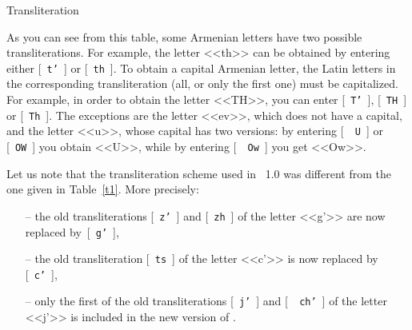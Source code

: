 \documentclass[12pt,a4paper,draft]{article}
\begin{document}
\begin{table}[ht]
\centerline{\vbox{\offinterlineskip
{}}}
\caption{Transliteration}
\label{t1}
\end{table}

As you can see from this table, some Armenian letters have two possible
transliterations. For example, the letter {\artm <<th>>} can be obtained by
entering either [~{\tt t'}~] or [~{\tt th}~]. To obtain a capital Armenian
letter, the Latin letters in the corresponding transliteration (all, or only
the first one) must be capitalized. For example, in order to obtain the letter
{\artm <<TH>>}, you can enter [~{\tt T'}~], [~{\tt TH}~] or [~{\tt Th}~]. The
exceptions are the letter {\artm <<ev>>}, which does not have a capital, and
the letter {\artm <<u>>}, whose capital has two versions: by entering [~{\tt
    U}~] or [~{\tt OW}~] you obtain {\artm <<U>>}, while by entering [~{\tt
    Ow}~] you get {\artm <<Ow>>}.

Let us note that the transliteration scheme used in \latArmTeX\ 1.0 was
different from the one given in Table~\ref{t1}. More precisely:
%
\begin{itemize}
%
\item[--]the old transliterations [~{\tt z'}~] and [~{\tt zh}~] of the letter
  {\artm <<g'>>} are now replaced by~[~{\tt g'}~],
%
\item[--]the old transliteration [~{\tt ts}~] of the letter {\artm <<c'>>} is
  now replaced by [~{\tt c'}~],
%
\item[--]only the first of the old transliterations [~{\tt j'}~] and [~{\tt
    ch'}~] of the letter {\artm <<j'>>} is included in the new version of
  \latArmTeX.
%
\end{itemize}
\end{document}
